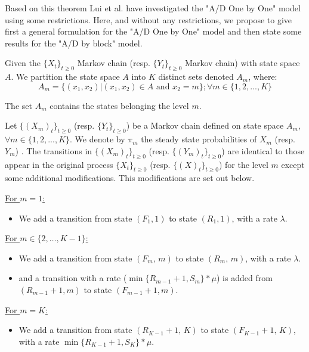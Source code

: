 \documentclass[conference]{IEEEtran}
\begin{document}
Based on this theorem Lui et al. have investigated the "A/D One by One" model using some restrictions. Here, and without any restrictions, we propose to give first a general formulation for the "A/D One by One" model and then state some results for the "A/D by block" model.


Given the $\{X_{t}\}_{t \geq 0}$ Markov chain (resp. $\{Y_{t}\}_{t \geq 0}$ Markov chain) with state space $A$. We partition the state space  $A$ into $K$ distinct sets denoted $A_{m}$, where:
\begin{equation}
A_{m}=\{(x_{1},x_{2})|(x_{1},x_{2}) \in A \mbox{ and } x_{2}=m\}; \forall m \in \{1,2,...,K \}
\end{equation}

The set $A_{m}$ contains the states belonging the level $m$.

Let $\{(X_{m})_{t}\}_{t \geq 0}$ (resp. $\{Y_{t}\}_{t \geq 0}$) be a Markov chain defined on state space $A_{m}$, $\forall m \in \{1,2,...,K \}$. We denote by  $\pi_{m}$ the steady state probabilities of $ X_{m}$ (resp. $ Y_{m}$) . The transitions in $\{(X_{m})_{t}\}_{t \geq 0}$ (resp. $\{(Y_{m})_{t}\}_{t \geq 0}$) are identical to those appear in the original process $\{X_{t}\}_{t \geq 0}$ (resp. $\{(X)_{t}\}_{t \geq 0}$) for the level $m$ except some additional modifications. This modifications are set out below.

\underline{For $m=1$:}

\begin{itemize}
    \item We add a transition  from state $(F_{1},1)$ to state $(R_{1},1)$, with a rate $\lambda$.
\end{itemize}

\underline{For $m \in \{2,\ldots,K-1\}$:}

\begin{itemize}
    \item We add a transition from state $(F_{m},\,m)$ to state $(R_{m},\,m)$,  with a rate $\lambda$.
    \item and a transition with a rate ($\min\{R_{m-1}+1,S_m\}*\mu$) is added from $(R_{m-1}+1,m)$ to state $(F_{m-1}+1,m)$.
\end{itemize}

\underline{For $m=K$:}

\begin{itemize}
    \item We add a transition from state $(R_{K-1}+1,\, K)$ to state $(F_{K-1}+1,\,K)$, with a rate $\min\{R_{K-1}+1,S_K\}*\mu$.
\end{itemize}
\end{document}
